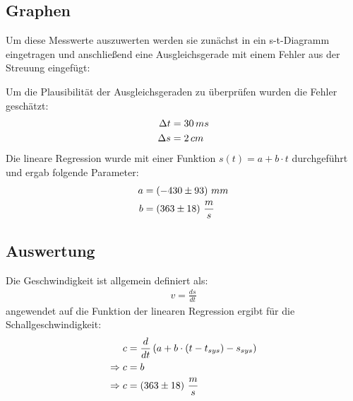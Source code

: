 \subsection{Graphen}
Um diese Messwerte auszuwerten werden sie zunächst in ein s-t-Diagramm eingetragen und anschließend eine Ausgleichsgerade mit einem Fehler aus der Streuung eingefügt:
\begin{center}
\begin{minipage}{\linewidth}
\centering
{}
\end{minipage}
\label{bsp}
\end{center}
Um die Plausibilität der Ausgleichsgeraden zu überprüfen wurden die Fehler geschätzt:
\begin{align}
\Delta t & = 30\, ms \notag \\
\Delta s & = 2\, cm \notag
\end{align}
Die lineare Regression wurde mit einer Funktion \(s(t) = a + b \cdot t\) durchgeführt und ergab folgende Parameter:
\begin{align}
a &= \left(-430 \pm 93 \right)\, mm \notag \\
b &= \left( 363 \pm 18 \right)\, \frac{m}{s} \notag
\end{align}
\subsection{Auswertung}
Die Geschwindigkeit ist allgemein definiert als:
\begin{align}
v = \frac{ds}{dt}
\end{align}
angewendet auf die Funktion der linearen Regression ergibt für die Schallgeschwindigkeit:
\begin{align}
c &= \frac{d}{dt} \left(a + b \cdot \left(t - t_{sys} \right) - s_{sys} \right) \label{drv}\\
\Rightarrow c &= b \\
\Rightarrow c &= \left( 363 \pm 18 \right)\, \frac{m}{s} \notag
\end{align}
